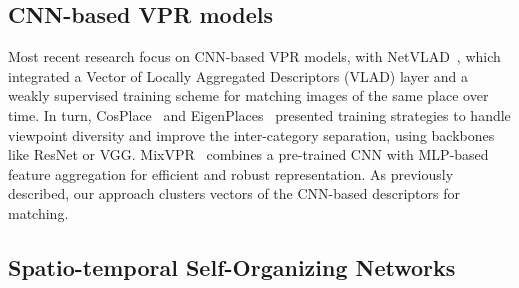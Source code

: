 \documentclass[letterpaper, 10 pt, conference]{ieeeconf}  %
\begin{document}
\subsection{CNN-based VPR models}






Most recent research focus on CNN-based VPR models, with NetVLAD~\cite{netvlad}, which integrated a Vector of Locally Aggregated Descriptors (VLAD) layer and a weakly supervised training scheme for matching images of the same place over time. In turn,  CosPlace~\cite{CosPlace} and EigenPlaces~\cite{EigenPlaces} presented training strategies to handle viewpoint diversity and improve the inter-category separation, using backbones like ResNet or VGG. MixVPR~\cite{mixvpr} combines a pre-trained CNN with MLP-based feature aggregation for efficient and robust representation. As previously described, our approach clusters vectors of the CNN-based descriptors for matching. 

\subsection{Spatio-temporal Self-Organizing Networks}
\end{document}
